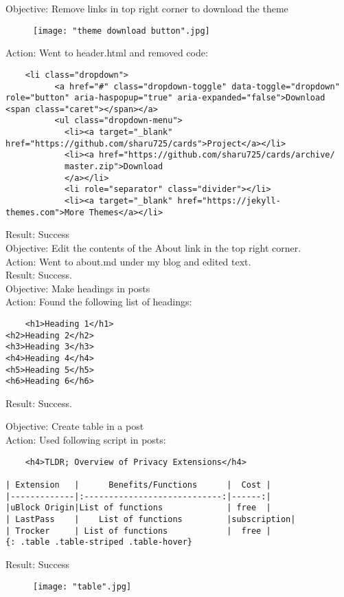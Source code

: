 \documentclass{article}
\begin{document}
Objective: Remove links in top right corner to download the theme\\
\begin{figure}[htp]
    \centering
    \texttt{[image: "theme download button".jpg]}
\end{figure}
\newline
Action: Went to header.html and removed code:
\begin{verbatim}
    <li class="dropdown">
          <a href="#" class="dropdown-toggle" data-toggle="dropdown" role="button" aria-haspopup="true" aria-expanded="false">Download <span class="caret"></span></a>
          <ul class="dropdown-menu">
            <li><a target="_blank" href="https://github.com/sharu725/cards">Project</a></li>
            <li><a href="https://github.com/sharu725/cards/archive/
            master.zip">Download
            </a></li>
            <li role="separator" class="divider"></li>
            <li><a target="_blank" href="https://jekyll-themes.com">More Themes</a></li>
\end{verbatim}
Result: Success\\

Objective: Edit the contents of the About link in the top right corner.\\
Action: Went to about.md under my blog and edited text.\\
Result: Success.\\

Objective: Make headings in posts\\
Action: Found the following list of headings: 
\begin{verbatim}
    <h1>Heading 1</h1>
<h2>Heading 2</h2>
<h3>Heading 3</h3>
<h4>Heading 4</h4>
<h5>Heading 5</h5>
<h6>Heading 6</h6>
\end{verbatim}
Result: Success.

Objective: Create table in a post\\
Action: Used following script in posts:
\begin{verbatim}
    <h4>TLDR; Overview of Privacy Extensions</h4>

| Extension   |      Benefits/Functions      |  Cost |
|-------------|:----------------------------:|------:|
|uBlock Origin|List of functions             | free  |
| LastPass    |    List of functions         |subscription|
| Trocker     | List of functions            |  free |
{: .table .table-striped .table-hover}
\end{verbatim}
Result: Success\\
\begin{figure}[htp]
    \centering
    \texttt{[image: "table".jpg]}
\end{figure}
\newline
\end{document}
